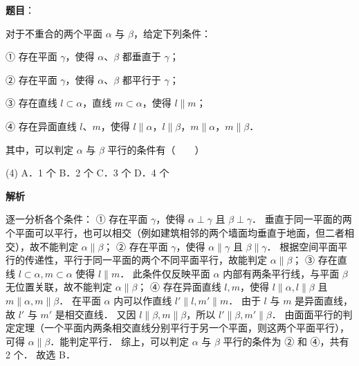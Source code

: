 \begin{answer}

\textbf{题目}：

对于不重合的两个平面 $\alpha$ 与 $\beta$，给定下列条件：

① 存在平面 $\gamma$，使得 $\alpha$、$\beta$ 都垂直于 $\gamma$；

② 存在平面 $\gamma$，使得 $\alpha$、$\beta$ 都平行于 $\gamma$；

③ 存在直线 $l \subset \alpha$，直线 $m \subset \alpha$，使得 $l \parallel m$；

④ 存在异面直线 $l$、$m$，使得 $l \parallel \alpha$，$l \parallel \beta$，$m \parallel \alpha$，$m \parallel \beta$．

其中，可以判定 $\alpha$ 与 $\beta$ 平行的条件有\mbox{（　　）}

\begin{gkopts}(4)
\task A．1 个
\task B．2 个
\task C．3 个
\task D．4 个
\end{gkopts}

\textbf{解析}

逐一分析各个条件：
① 存在平面 $\gamma$，使得 $\alpha \perp \gamma$ 且 $\beta \perp \gamma$．
垂直于同一平面的两个平面可以平行，也可以相交（例如建筑相邻的两个墙面均垂直于地面，但二者相交），故不能判定 $\alpha \parallel \beta$；
② 存在平面 $\gamma$，使得 $\alpha \parallel \gamma$ 且 $\beta \parallel \gamma$．
根据空间平面平行的传递性，平行于同一平面的两个不同平面平行，故能判定 $\alpha \parallel \beta$；
③ 存在直线 $l \subset \alpha, m \subset \alpha$ 使得 $l \parallel m$．
此条件仅反映平面 $\alpha$ 内部有两条平行线，与平面 $\beta$ 无位置关联，故不能判定 $\alpha \parallel \beta$；
④ 存在异面直线 $l, m$，使得 $l \parallel \alpha, l \parallel \beta$ 且 $m \parallel \alpha, m \parallel \beta$．
在平面 $\alpha$ 内可以作直线 $l' \parallel l, m' \parallel m$．
由于 $l$ 与 $m$ 是异面直线，故 $l'$ 与 $m'$ 是相交直线．
又因 $l \parallel \beta, m \parallel \beta$，所以 $l' \parallel \beta, m' \parallel \beta$．
由面面平行的判定定理（一个平面内两条相交直线分别平行于另一个平面，则这两个平面平行），可得 $\alpha \parallel \beta$．能判定平行．
综上，可以判定 $\alpha$ 与 $\beta$ 平行的条件为 ② 和 ④，共有 2 个．
故选 B．


\end{answer}
